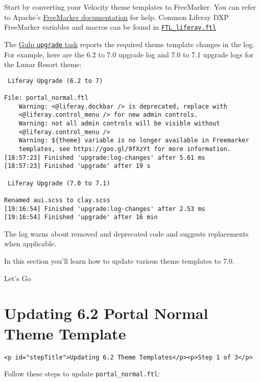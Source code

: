 Start by converting your Velocity theme templates to FreeMarker. You can
refer to Apache's
\href{https://freemarker.apache.org/docs/ref.html}{FreeMarker
documentation} for help. Common Liferay DXP FreeMarker variables and
macros can be found in
\href{https://github.com/liferay/liferay-portal/blob/7.2.x/modules/apps/portal-template/portal-template-freemarker/src/main/resources/FTL_liferay.ftl}{\texttt{FTL\_liferay.ftl}}

The \href{running-the-upgrade-task-for-6.2-themes}{Gulp \texttt{upgrade}
task} reports the required theme template changes in the log. For
example, here are the 6.2 to 7.0 upgrade log and 7.0 to 7.1 upgrade logs
for the Lunar Resort theme:

\begin{verbatim}
 Liferay Upgrade (6.2 to 7)

File: portal_normal.ftl
    Warning: <@liferay.dockbar /> is deprecated, replace with 
    <@liferay.control_menu /> for new admin controls.
    Warning: not all admin controls will be visible without 
    <@liferay.control_menu />
    Warning: ${theme} variable is no longer available in Freemarker 
    templates, see https://goo.gl/9fXzYt for more information.
[18:57:23] Finished 'upgrade:log-changes' after 5.61 ms
[18:57:23] Finished 'upgrade' after 19 s

 Liferay Upgrade (7.0 to 7.1)

Renamed aui.scss to clay.scss
[19:16:54] Finished 'upgrade:log-changes' after 2.53 ms
[19:16:54] Finished 'upgrade' after 16 min
\end{verbatim}

The log warns about removed and deprecated code and suggests
replacements when applicable.

In this section you'll learn how to update various theme templates to
7.0.

Let's Go{}

\chapter{Updating 6.2 Portal Normal Theme
Template}\label{updating-6.2-portal-normal-theme-template}

\begin{verbatim}
<p id="stepTitle">Updating 6.2 Theme Templates</p><p>Step 1 of 3</p>
\end{verbatim}

Follow these steps to update \texttt{portal\_normal.ftl}:


